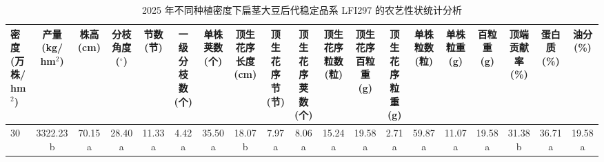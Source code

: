 \documentclass[UTF8,oneside,openany,driverfallback=dvipdfmx,pdfencoding=unicode,hidelinks]{jlutex}
\begin{document}
\begin{table}
		
		\centering
		\caption{2025 年不同种植密度下扁茎大豆后代稳定品系 LFI297 的农艺性状统计分析}
		\label{tab:agri2025}
		\footnotesize
		\setlength{\tabcolsep}{3.5pt}
		\begin{tabular}{lcccccccccccccccccc}
			\toprule
			\makecell[l]{密度\\(万株/\\hm$^2$)} & \makecell{产量\\(kg/\\hm$^2$)} & \makecell{株高\\(cm)} & \makecell{分枝\\角度\\($^\circ$)} & \makecell{节数\\(节)} & \makecell{一级\\分枝\\数(个)} & \makecell{单株\\荚数\\(个)} & \makecell{顶生\\花序\\长度\\(cm)} & \makecell{顶生\\花序\\节(节)} & \makecell{顶生\\花序\\荚数\\(个)} & \makecell{顶生\\花序\\粒数\\(粒)} & \makecell{顶生\\花序\\百粒\\重(g)} & \makecell{顶生\\花序\\粒重\\(g)} & \makecell{单株\\粒数\\(粒)} & \makecell{单株\\粒重\\(g)} & \makecell{百粒\\重\\(g)} & \makecell{顶端\\贡献\\率(\%)} & \makecell{蛋白\\质\\(\%)} & \makecell{油分\\(\%)} \\
			\midrule
			30 & 3322.23 b & 70.15 a & 28.40 a & 11.33 a & 4.42 a & 35.50 a & 18.07 b & 7.97 a & 8.06 a & 15.24 a & 19.58 a & 2.71 a & 59.87 a & 11.07 a & 19.58 a & 31.38 b & 36.71 a & 19.58 a \\

\end{tabular}
\end{table}
\end{document}

